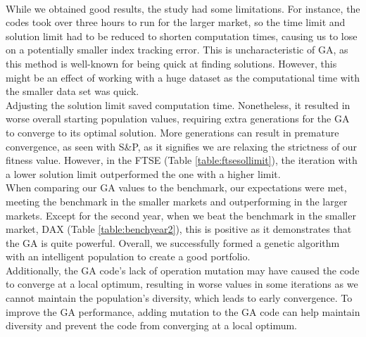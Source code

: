 \documentclass[12pt]{report}
\begin{document}
{%
\\ \newline \noindent
While we obtained good results, the study had some limitations. For instance, the codes took over three hours to run for the larger market, so the time limit and solution limit had to be reduced to shorten computation times, causing us to lose on a potentially smaller index tracking error. This is uncharacteristic of GA, as this method is well-known for being quick at finding solutions. However, this might be an effect of working with a huge dataset as the computational time with the smaller data set was quick. 
\\ \newline \noindent
Adjusting the solution limit saved computation time. Nonetheless, it resulted in worse overall starting population values, requiring extra generations for the GA to converge to its optimal solution. More generations can result in premature convergence, as seen with S\&P, as it signifies we are relaxing the strictness of our fitness value. However, in the FTSE (Table \ref{table:ftsesollimit}), the iteration with a lower solution limit outperformed the one with a higher limit.
\\ \newline \noindent
When comparing our GA values to the benchmark, our expectations were met, meeting the benchmark in the smaller markets and outperforming in the larger markets. Except for the second year, when we beat the benchmark in the smaller market, DAX (Table \ref{table:benchyear2}), this is positive as it demonstrates that the GA is quite powerful. Overall, we successfully formed a genetic algorithm with an intelligent population to create a good portfolio.
\\ \newline \noindent
Additionally, the GA code's lack of operation mutation may have caused the code to converge at a local optimum, resulting in worse values in some iterations as we cannot maintain the population's diversity, which leads to early convergence. To improve the GA performance, adding mutation to the GA code can help maintain diversity and prevent the code from converging at a local optimum.
\\ \newline \noindent
}
\end{document}
